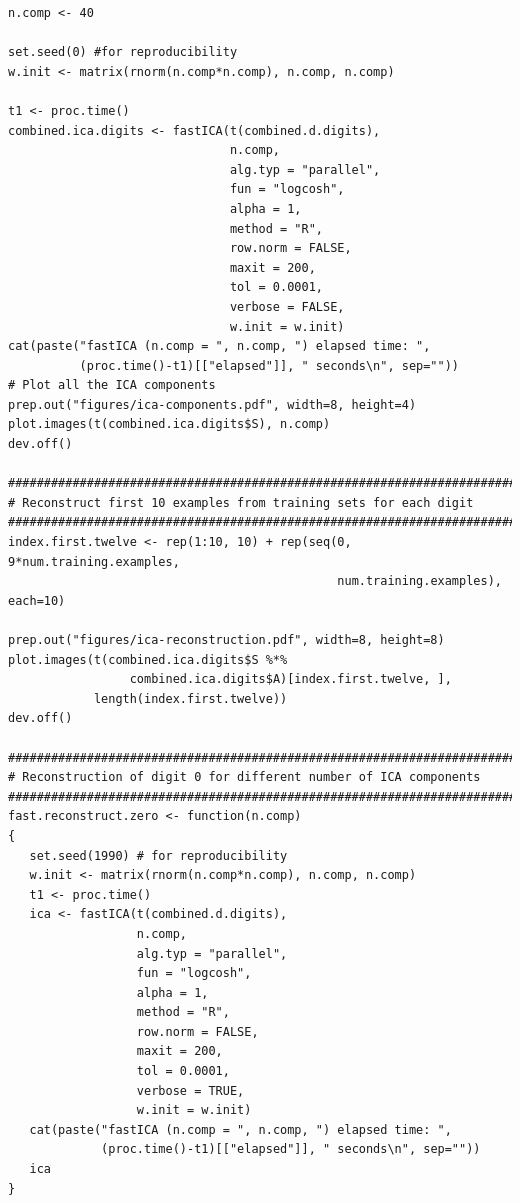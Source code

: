 \documentclass[12pt,article,oneside]{memoir}
\begin{document}
\begin{verbatim}
n.comp <- 40

set.seed(0) #for reproducibility
w.init <- matrix(rnorm(n.comp*n.comp), n.comp, n.comp)

t1 <- proc.time()
combined.ica.digits <- fastICA(t(combined.d.digits),
                               n.comp,
                               alg.typ = "parallel",
                               fun = "logcosh",
                               alpha = 1,
                               method = "R",
                               row.norm = FALSE,
                               maxit = 200,
                               tol = 0.0001,
                               verbose = FALSE,
                               w.init = w.init)
cat(paste("fastICA (n.comp = ", n.comp, ") elapsed time: ",
          (proc.time()-t1)[["elapsed"]], " seconds\n", sep=""))
# Plot all the ICA components
prep.out("figures/ica-components.pdf", width=8, height=4)
plot.images(t(combined.ica.digits$S), n.comp)
dev.off()

########################################################################
# Reconstruct first 10 examples from training sets for each digit
########################################################################
index.first.twelve <- rep(1:10, 10) + rep(seq(0, 9*num.training.examples,
                                              num.training.examples), each=10)

prep.out("figures/ica-reconstruction.pdf", width=8, height=8)
plot.images(t(combined.ica.digits$S %*%
                 combined.ica.digits$A)[index.first.twelve, ],
            length(index.first.twelve))
dev.off()

########################################################################
# Reconstruction of digit 0 for different number of ICA components
########################################################################
fast.reconstruct.zero <- function(n.comp)
{
   set.seed(1990) # for reproducibility
   w.init <- matrix(rnorm(n.comp*n.comp), n.comp, n.comp)
   t1 <- proc.time()
   ica <- fastICA(t(combined.d.digits),
                  n.comp,
                  alg.typ = "parallel",
                  fun = "logcosh",
                  alpha = 1,
                  method = "R",
                  row.norm = FALSE,
                  maxit = 200,
                  tol = 0.0001,
                  verbose = TRUE,
                  w.init = w.init)
   cat(paste("fastICA (n.comp = ", n.comp, ") elapsed time: ",
             (proc.time()-t1)[["elapsed"]], " seconds\n", sep=""))
   ica
}


\end{verbatim}
\end{document}
